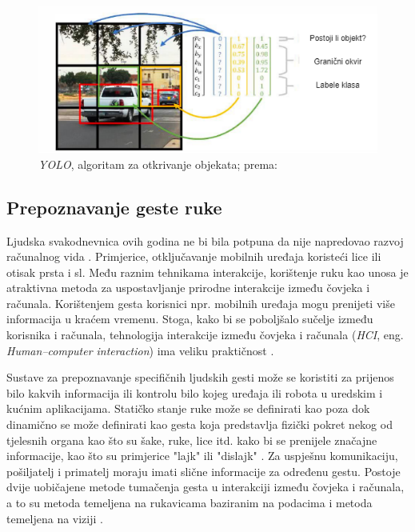 \documentclass[]{foi} %
\begin{document}
\begin{figure}[!ht]
    \centering
    \includegraphics[width=1\textwidth]{slike/yolo.png}
    \caption{\textit{YOLO}, algoritam za otkrivanje objekata; prema: \cite{szeliskicvaa}}
    \label{fig:yolo}
\end{figure}

\newpage
\subsection{Prepoznavanje geste ruke}

Ljudska svakodnevnica ovih godina ne bi bila potpuna da nije napredovao razvoj računalnog vida \cite{hand3, hand1}. Primjerice, otključavanje mobilnih uređaja koristeći lice ili otisak prsta i sl. Među raznim tehnikama interakcije, korištenje ruku kao unosa je atraktivna metoda za uspostavljanje prirodne interakcije između čovjeka i računala. Korištenjem gesta korisnici npr. mobilnih uređaja mogu prenijeti više informacija u kraćem vremenu. Stoga, kako bi se poboljšalo sučelje između korisnika i računala, tehnologija interakcije između čovjeka i računala (\textit{HCI}, eng. \textit{Human–computer interaction}) ima veliku praktičnost \cite{hand3, hand1}.

Sustave za prepoznavanje specifičnih ljudskih gesti može se koristiti za prijenos bilo kakvih informacija ili kontrolu bilo kojeg uređaja ili robota u uredskim i kućnim aplikacijama. Statičko stanje ruke može se definirati kao poza dok dinamično se može definirati kao gesta koja predstavlja fizički pokret nekog od tjelesnih organa kao što su šake, ruke, lice itd. kako bi se prenijele značajne informacije, kao što su primjerice "lajk" ili "dislajk" \cite{hand1, hand2}. Za uspješnu komunikaciju, pošiljatelj i primatelj moraju imati slične informacije za određenu gestu. Postoje dvije uobičajene metode tumačenja gesta u interakciji između čovjeka i računala, a to su metoda temeljena na rukavicama baziranim na podacima i metoda temeljena na viziji \cite{hand2}.
\end{document}
